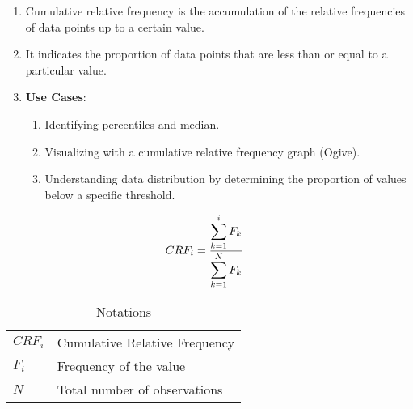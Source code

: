 \begin{enumerate}
    \item Cumulative relative frequency is the accumulation of the relative frequencies of data points up to a certain value. \cite{common/online/chatgpt}

    \item It indicates the proportion of data points that are less than or equal to a particular value. \cite{common/online/chatgpt}

    \item \textbf{Use Cases}:
    \begin{enumerate}
        \item Identifying percentiles and median.

        \item Visualizing with a cumulative relative frequency graph (Ogive).

        \item Understanding data distribution by determining the proportion of values below a specific threshold.
    \end{enumerate}
\end{enumerate}



\begin{table}[H]
    \begin{minipage}{0.3\linewidth}
        \[
            \begin{aligned}
                CRF_i 
                    &= \dfrac{\displaystyle\sum_{k=1}^{i} F_{k}}{\displaystyle\sum_{k=1}^{N} F_{k}}
            \end{aligned}
        \]
    \end{minipage}
    \begin{minipage}{0.65\linewidth}
        \begin{table}[H]
            \begin{tabular}{l l}
                $CRF_i$ & Cumulative Relative Frequency \\
                $F_i$ & Frequency of the value \\ 
                $N$ & Total number of observations \\ 
            \end{tabular}
            \caption*{Notations}
        \end{table}
    \end{minipage}
\end{table}





